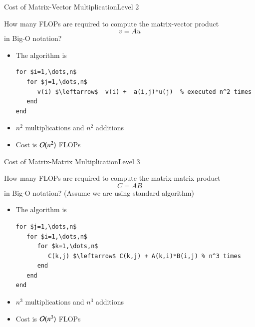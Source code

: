 \documentclass[10pt]{beamer}
\begin{document}

\begin{frame}[fragile]{Cost of Matrix-Vector Multiplication}{Level 2}
\begin{example}
    How many FLOPs are required to compute the matrix-vector product
        $$ v = Au$$
    in Big-O notation?
\end{example}

\begin{itemize}
    \item The algorithm is
\begin{lstlisting}[mathescape]
for $i=1,\dots,n$
   for $j=1,\dots,n$
      v(i) $\leftarrow$  v(i) +  a(i,j)*u(j)  % executed n^2 times
   end
end
\end{lstlisting}
  \item $n^2$ multiplications and  $n^2$ additions
  \item Cost is ${\mathcal{O}}(n^2)$ FLOPs
\end{itemize}
\end{frame}
\begin{frame}[fragile]{Cost of Matrix-Matrix Multiplication}{Level 3}
\begin{example}
    How many FLOPs are required to compute the matrix-matrix product 
        $$C = AB$$
    in Big-O notation? (Assume we are using standard algorithm)
\end{example}
\begin{itemize}
\item The algorithm is
\begin{lstlisting}[mathescape]
for $j=1,\dots,n$
   for $i=1,\dots,n$
      for $k=1,\dots,n$
         C(k,j) $\leftarrow$ C(k,j) + A(k,i)*B(i,j) % n^3 times
      end
   end
end
\end{lstlisting}
  \item $n^3$ multiplications and  $n^3$ additions
  \item Cost is ${\mathcal{O}}(n^3)$ FLOPs
\end{itemize}
\end{frame}
\end{document}
